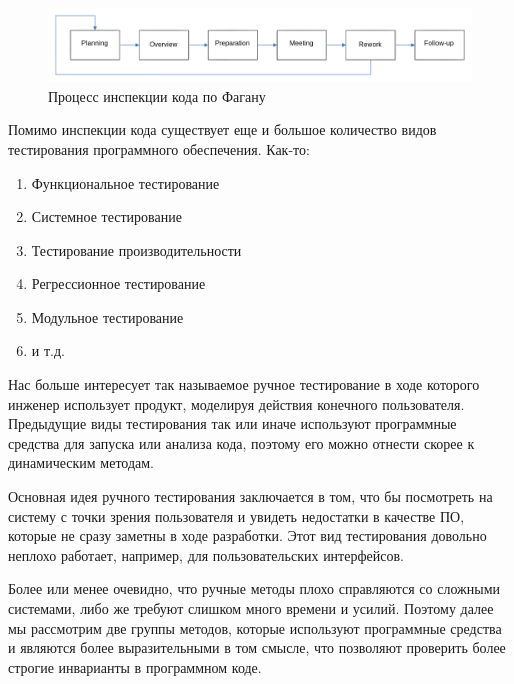 \begin{figure}[H]
  \centering
  \includegraphics[width=\textwidth]{img/fagan.png}
  \caption{Процесс инспекции кода по Фагану}
\end{figure}

Помимо инспекции кода существует еще и большое количество видов тестирования программного обеспечения. Как-то:

\begin{enumerate}
  \item Функциональное тестирование
  \item Системное тестирование
  \item Тестирование производительности
  \item Регрессионное тестирование
  \item Модульное тестирование
  \item и т.д.
\end{enumerate}

Нас больше интересует так называемое ручное тестирование в ходе которого инженер использует продукт, моделируя действия конечного пользователя. Предыдущие виды тестирования так или иначе используют программные средства для запуска или анализа кода, поэтому его можно отнести скорее к динамическим методам.

Основная идея ручного тестирования заключается в том, что бы посмотреть на систему с точки зрения пользователя и увидеть недостатки в качестве ПО, которые не сразу заметны в ходе разработки. Этот вид тестирования довольно неплохо работает, например, для пользовательских интерфейсов.

Более или менее очевидно, что ручные методы плохо справляются со сложными системами, либо же требуют слишком много времени и усилий. Поэтому далее мы рассмотрим две группы методов, которые используют программные средства и являются более выразительными в том смысле, что позволяют проверить более строгие инварианты в программном коде.
